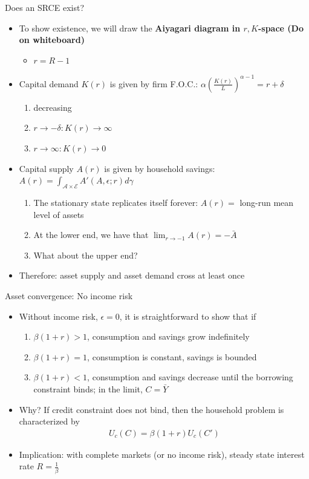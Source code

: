 \documentclass[9pt]{beamer}
\newcommand{\bit}{\begin{itemize}}
\newcommand{\eit}{\end{itemize}}
\newcommand{\ben}{\begin{enumerate}}
\newcommand{\een}{\end{enumerate}}
\newcommand{\rc}{\color{red}}
\begin{document}
\begin{frame}{Does an SRCE exist?}

\bit
\setlength\itemsep{1.5em}

\item To show existence, we will draw the \bf Aiyagari diagram \normalfont in $r,K$-space {\rc (Do on whiteboard)} 
\bit
	\item $r = R -1$
\eit

\item Capital demand $K(r)$ is given by firm F.O.C.: $\alpha \left(\frac{K(r)}{L}\right)^{\alpha-1} = r+\delta $
\ben
\setlength\itemsep{0.5em}
	\item decreasing
	\item $r \to -\delta: K(r) \to \infty$
	\item $r \to \infty: K(r) \to  0$
\een

\item Capital supply $A(r)$ is given by household savings: $A(r) = \int_{\bm{\mathcal A} \times \bm{\mathcal E}} A'(A,\epsilon; r) d\gamma $
\ben
\setlength\itemsep{0.5em}
\item The stationary state replicates itself forever: $A(r) = $ long-run mean level of assets  
\item At the lower end, we have that $\lim_{r \to -1} A(r) = - \bar A$
\item What about the upper end?
\een

\item {\color{white} Therefore: asset supply and asset demand cross at least once}

\eit

\end{frame}


\begin{frame}{Asset convergence: No income risk}

\bit
\setlength\itemsep{1.5em}

\item Without income risk, $\epsilon=0$, it is straightforward to show that if
\ben
\setlength\itemsep{0.5em}
\item $\beta (1+r) > 1$, consumption and savings grow indefinitely
\item $\beta (1+r) = 1$, consumption is constant, savings is bounded
\item $\beta (1+r) < 1$, consumption and savings decrease until the borrowing constraint binds; in the limit, $C=\bar Y$
\een

\item Why? If credit constraint does not bind, then the household problem is characterized by
\begin{eqnarray}
U_c(C) = \beta (1+r) U_c(C') \nonumber
\end{eqnarray}

\item Implication: with complete markets (or no income risk), steady state interest rate $R=\frac{1}{\beta}$

\eit

\end{frame}
\end{document}
